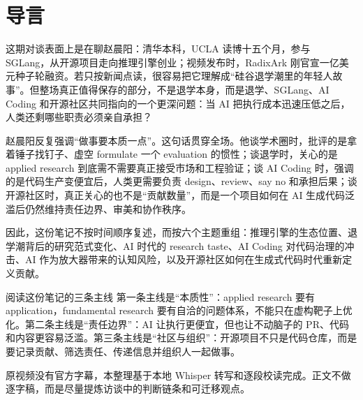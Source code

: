 \section*{导言}

这期对谈表面上是在聊赵晨阳：清华本科，UCLA 读博十五个月，参与 SGLang，从开源项目走向推理引擎创业；视频发布时，RadixArk 刚官宣一亿美元种子轮融资。若只按新闻点读，很容易把它理解成“硅谷退学潮里的年轻人故事”。但整场真正值得保存的部分，不是退学本身，而是退学、SGLang、AI Coding 和开源社区共同指向的一个更深问题：当 AI 把执行成本迅速压低之后，人类还剩哪些职责必须亲自承担？

赵晨阳反复强调“做事要本质一点”。这句话贯穿全场。他谈学术圈时，批评的是拿着锤子找钉子、虚空 formulate 一个 evaluation 的惯性；谈退学时，关心的是 applied research 到底需不需要真正接受市场和工程验证；谈 AI Coding 时，强调的是代码生产变便宜后，人类更需要负责 design、review、say no 和承担后果；谈开源社区时，真正关心的也不是“贡献数量”，而是一个项目如何在 AI 生成代码泛滥后仍然维持责任边界、审美和协作秩序。

因此，这份笔记不按时间顺序复述，而按六个主题重组：推理引擎的生态位置、退学潮背后的研究范式变化、AI 时代的 research taste、AI Coding 对代码治理的冲击、AI 作为放大器带来的认知风险，以及开源社区如何在生成式代码时代重新定义贡献。

\begin{importantbox}{阅读这份笔记的三条主线}
第一条主线是“本质性”：applied research 要有 application，fundamental research 要有自洽的问题体系，不能只在虚构靶子上优化。第二条主线是“责任边界”：AI 让执行更便宜，但也让不动脑子的 PR、代码和内容更容易泛滥。第三条主线是“社区与组织”：开源项目不只是代码仓库，而是要记录贡献、筛选责任、传递信息并组织人一起做事。
\end{importantbox}

原视频没有官方字幕，本整理基于本地 Whisper 转写和逐段校读完成。正文不做逐字稿，而是尽量提炼访谈中的判断链条和可迁移观点。

